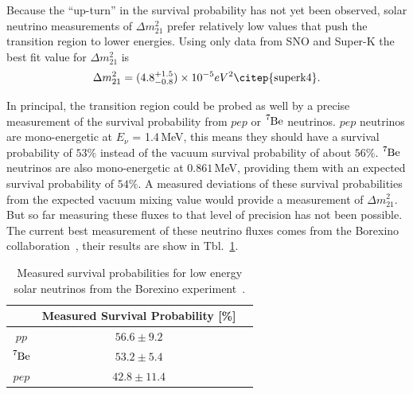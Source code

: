 Because the ``up-turn'' in the survival probability has not yet been observed,
solar neutrino measurements of $\Delta m^{2}_{21}$ prefer relatively low values
that push the transition region to lower energies.
Using only data from SNO and Super-K the best fit value for 
$\Delta m^{2}_{21}$ is
\begin{equation*}
    \Delta m^{2}_{21} = (4.8^{+1.5}_{-0.8})\times 10^{-5} eV^{2}\text{\citep{superk4}.}
\end{equation*}


In principal, the transition region could be probed as well by a precise
measurement of the survival probability from $pep$ or $\ce{^{7}Be}$ neutrinos.
$pep$ neutrinos are mono-energetic at $E_{\nu}$ = 1.4\,MeV,
this means they should have a survival probability of $53\%$ instead of the
vacuum survival probability of about $56\%$.
$\ce{^{7}Be}$ neutrinos are also mono-energetic at $0.861$\,MeV, providing
them with an expected survival probability of $54\%$.
A measured deviations of these survival probabilities from the expected
vacuum mixing value would provide a measurement of $\Delta m^{2}_{21}$.
But so far measuring these fluxes to that level of precision has not been
possible.
The current best measurement of these neutrino fluxes comes from the Borexino
collaboration~\citep{borexino_nature}, their results are show in Tbl.~\ref{tbl:borexino_results}.
\begin{table}
    \centering
    \begin{tabular} {c| c c}
        & Measured Survival Probability [\%]\\
        \hline
        $pp$ & $56.6 \pm  9.2$\\
        $\ce{^{7}Be}$ & $53.2\pm 5.4$ \\
        $pep$ & $42.8\pm11.4$ \\
    \end{tabular}
    \caption[Borexino Measured Low Energy Survival Probabilities]{
        Measured survival probabilities for low energy solar neutrinos
        from the Borexino experiment~\citep{borexino_nature}.}
    \label{tbl:borexino_results}
\end{table}

